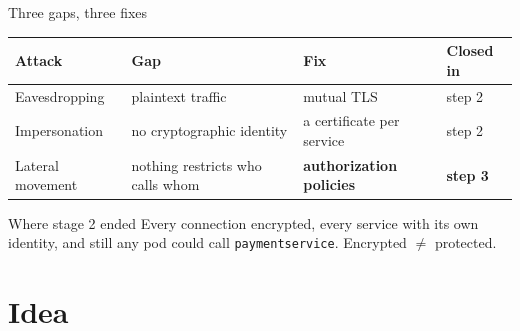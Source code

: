 \documentclass[9pt,aspectratio=169]{beamer}
\begin{document}
\begin{frame}{Three gaps, three fixes}
  \centering
  \vspace{4pt}
  \begin{tabular}{llll}
    \toprule
    \textbf{Attack}  & \textbf{Gap} & \textbf{Fix} & \textbf{Closed in} \\
    \midrule
    Eavesdropping    & plaintext traffic                 & mutual TLS                   & step 2 \\
    Impersonation    & no cryptographic identity         & a certificate per service    & step 2 \\
    Lateral movement & nothing restricts who calls whom  & \textbf{authorization policies} & \textbf{step 3} \\
    \bottomrule
  \end{tabular}

  \vspace{12pt}
  \begin{alertblock}{Where stage 2 ended}
    Every connection encrypted, every service with its own identity, and still
    any pod could call \texttt{paymentservice}. Encrypted $\neq$ protected.
  \end{alertblock}
\end{frame}

\section{Idea}
\end{document}
